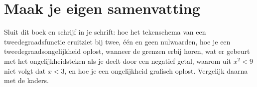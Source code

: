 
\ifzelfstudie
\section*{Maak je eigen samenvatting}
Sluit dit boek en schrijf in je schrift: hoe het tekenschema van een tweedegraadsfunctie eruitziet bij twee, één en geen nulwaarden, hoe je een tweedegraadsongelijkheid oplost, wanneer de grenzen erbij horen, wat er gebeurt met het ongelijkheidsteken als je deelt door een negatief getal, waarom uit $x^2 < 9$ niet volgt dat $x < 3$, en hoe je een ongelijkheid grafisch oplost. Vergelijk daarna met de kaders.
\fi
